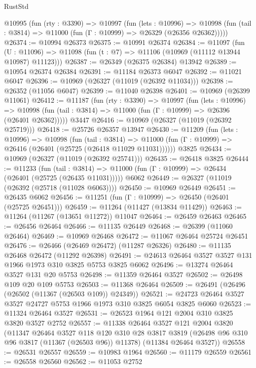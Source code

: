 \begin{lexlean}{RustStd}
\begin{coremodule}
  @10995
    (fun (rty : @3390) =>
    @10997
      (fun (lets : @10996) =>
      @10998 (fun (tail : @3814) => @11000 (fun (Γ : @10999) => @26329 (@26356 @26362)))))
@26374 := @10994 @26373
@26375 := @10991 @26374
@26384 := @11097
    (fun (U : @11096) => @11098 (fun (t : @7) => @11106 (@10969 (@11112 @13944 @10987) @11123)))
@26387 := @26349 (@26375 @26384) @13942
@26389 := @10954 @26374 @26384
@26391 := @11184 @26373 @6047
@26392 := @11021 @6047
@26396 := @10969 (@26327 (@11019 (@26392 @11034)))
@26398 := @26352 (@11056 @6047)
@26399 := @11040 @26398
@26401 := @10969 (@26399 @11061)
@26412 := @11187
    (fun (rty : @3390) =>
    @10997
      (fun (lets : @10996) =>
      @10998 (fun (tail : @3814) => @11000 (fun (Γ : @10999) => @26396 (@26401 @26362)))))
    @3447
@26416 := @10969 (@26327 (@11019 (@26392 @25719)))
@26418 := @25726 @26357 @13947
@26430 := @11209
    (fun (lets : @10996) =>
    @10998
      (fun (tail : @3814) =>
      @11000 (fun (Γ : @10999) => @26416 (@26401 (@25725 (@26418 @11029 @11031))))))
    @3825
@26434 := @10969 (@26327 (@11019 (@26392 @25741)))
@26435 := @26418 @3825
@26444 := @11233
    (fun (tail : @3814) => @11000 (fun (Γ : @10999) => @26434 (@26401 (@25725 (@26435 @11031)))))
    @6062
@26449 := @26327 (@11019 (@26392 (@25718 (@11028 @6063))))
@26450 := @10969 @26449
@26451 := @26435 @6062
@26456 := @11251 (fun (Γ : @10999) => @26450 (@26401 (@25725 @26451)))
@26459 := @11264 (@11427 (@13834 @11429))
@26463 := @11264 (@11267 (@13651 @11272)) @11047
@26464 := @26459 @26463
@26465 := @26456 @26464
@26466 := @11135 @26449
@26468 := @26399 (@11060 @26464)
@26469 := @10969 @26468
@26472 := @11067 @26464 @25724 @26451
@26476 := @26466 (@26469 @26472) (@11287 @26326)
@26480 := @11135 @26468 @26472 (@11292 @26398)
@26491 := @24613 @26464 @3527 @3527 @131 @1966 @1973 @310 @3825 @5753 @3825 @6062
@26496 := @13274 @26464 @3527 @131 @20 @5753
@26498 := @11359 @26464 @3527
@26502 := @26498 @109 @20 @109 @5753
@26503 := @11368 @26464
@26509 := @26491 (@26496 (@26502 (@11367 (@26503 @109)) @24349))
@26521 := @24723 @26464 @3527 @3527 @24727 @5753 @1966 @1973 @310 @3825 @6054 @3825 @6060
@26523 := @11324 @26464 @3527
@26531 := @26523 @1964 @121 @2004 @310 @3825 @3820 @3527 @2752
@26557 := @11338
    @26464
    @3527
    @121
    @2004
    @3820
    (@11347
      @26464
      @3527
      @118
      @120
      @310
      @28
      @3817
      @3819
      (@26498 @96 @310 @96 @3817 (@11367 (@26503 @96)) @11378)
      (@11384 @26464 @3527))
@26558 := @26531 @26557
@26559 := @10983 @1964
@26560 := @11179 @26559
@26561 := @26558 @26560
@26562 := @11053 @2752

\end{coremodule}
\end{lexlean}
